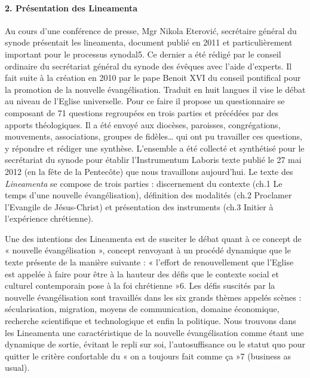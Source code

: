 \paragraph{2. Présentation des Lineamenta}
Au cours d’une conférence de presse, Mgr Nikola Eterović, secrétaire général du synode présentait
les lineamenta, document publié en 2011 et particulièrement important pour le processus synodal5.
Ce dernier a été rédigé par le conseil ordinaire du secrétariat général du synode des évêques avec
l’aide d’experts. Il fait suite à la création en 2010 par le pape Benoit XVI du conseil pontifical pour
la promotion de la nouvelle évangélisation. Traduit en huit langues il vise le débat au niveau de
l’Eglise universelle. Pour ce faire il propose un questionnaire se composant de 71 questions
regroupées en trois parties et précédées par des apports théologiques. Il a été envoyé aux diocèses,
paroisses, congrégations, mouvements, associations, groupes de fidèles… qui ont pu travailler ces
questions, y répondre et rédiger une synthèse. L’ensemble a été collecté et synthétisé pour le
secrétariat du synode pour établir l’Instrumentum Laboris texte publié le 27 mai 2012 (en la fête de
la Pentecôte) que nous travaillons aujourd’hui.
Le texte des \textit{Lineamenta} se compose de trois parties : discernement du contexte (ch.1 Le temps d’une
nouvelle évangélisation), définition des modalités (ch.2 Proclamer l’Evangile de Jésus-Christ) et
présentation des instruments (ch.3 Initier à l’expérience chrétienne).
 
 
Une des intentions des Lineamenta est de susciter le débat quant à ce concept de « nouvelle
évangélisation », concept renvoyant à un procédé dynamique que le texte présente de la manière
suivante : « l'effort de renouvellement que l'Eglise est appelée à faire pour être à la hauteur des défis
que le contexte social et culturel contemporain pose à la foi chrétienne »6.
Les défis suscités par la nouvelle évangélisation sont travaillés dans les six grands thèmes appelés
scènes : sécularisation, migration, moyens de communication, domaine économique, recherche
scientifique et technologique et enfin la politique. Nous trouvons dans les Lineamenta une
caractéristique de la nouvelle évangélisation comme étant une dynamique de sortie, évitant le repli
sur soi, l’autosuffisance ou le statut quo pour quitter le critère confortable du « on a toujours fait
comme ça »7 (business as usual).
